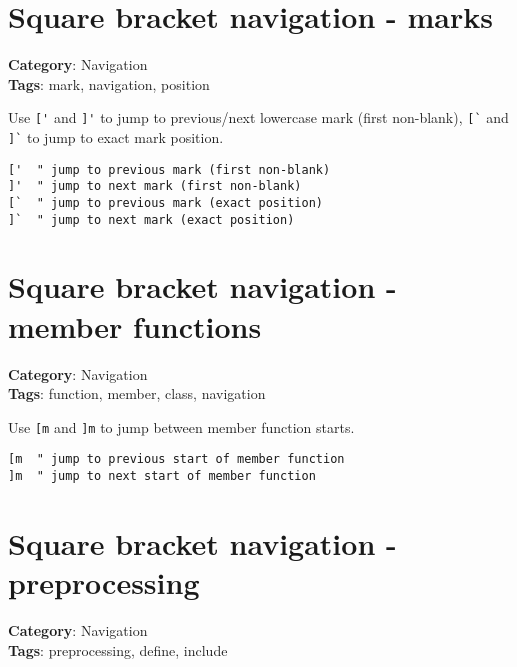 {{{{{{{{{{\section{Square bracket navigation - marks}

\textbf{Category}: Navigation\\ \textbf{Tags}: mark, navigation, position
\vspace{0.5cm}

Use {\footnotesize \Verb§['§} and {\footnotesize \Verb§]'§} to jump to previous/next lowercase mark (first non-blank), {\footnotesize \Verb§[`§} and {\footnotesize \Verb§]`§} to jump to exact mark position.

\begin{Exa*}{}
\begin{Verbatim}[fontsize=\footnotesize, breaklines, breakanywhere]
['  " jump to previous mark (first non-blank)
]'  " jump to next mark (first non-blank)
[`  " jump to previous mark (exact position)
]`  " jump to next mark (exact position)
\end{Verbatim}
\end{Exa*}

\section{Square bracket navigation - member functions}

\textbf{Category}: Navigation\\ \textbf{Tags}: function, member, class, navigation
\vspace{0.5cm}

Use {\footnotesize \Verb§[m§} and {\footnotesize \Verb§]m§} to jump between member function starts.

\begin{Exa*}{}
\begin{Verbatim}[fontsize=\footnotesize, breaklines, breakanywhere]
[m  " jump to previous start of member function
]m  " jump to next start of member function
\end{Verbatim}
\end{Exa*}

\section{Square bracket navigation - preprocessing}

\textbf{Category}: Navigation\\ \textbf{Tags}: preprocessing, define, include
\vspace{0.5cm}

}}}}}}}}}}

